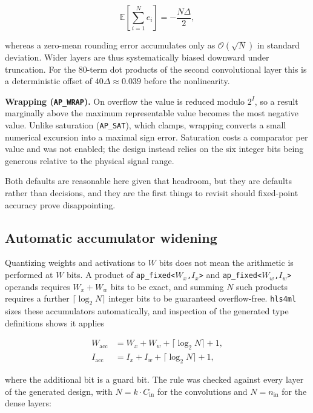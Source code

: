 \documentclass[11pt,a4paper]{article}
\begin{document}
\begin{equation}
\mathbb{E}\!\left[\sum_{i=1}^{N} e_i\right] = -\frac{N\Delta}{2},
\end{equation}

whereas a zero-mean rounding error accumulates only as $\mathcal{O}(\sqrt{N})$
in standard deviation. Wider layers are thus systematically biased downward
under truncation. For the 80-term dot products of the second convolutional
layer this is a deterministic offset of $40\Delta \approx 0.039$ before the
nonlinearity.

\textbf{Wrapping (\texttt{AP\_WRAP}).} On overflow the value is reduced modulo
$2^{I}$, so a result marginally above the maximum representable value becomes
the most negative value. Unlike saturation (\texttt{AP\_SAT}), which clamps,
wrapping converts a small numerical excursion into a maximal sign error.
Saturation costs a comparator per value and was not enabled; the design instead
relies on the six integer bits being generous relative to the physical signal
range.

Both defaults are reasonable here given that headroom, but they are defaults
rather than decisions, and they are the first things to revisit should
fixed-point accuracy prove disappointing.

\subsection{Automatic accumulator widening}
\label{sec:accum}

Quantizing weights and activations to $W$ bits does not mean the arithmetic is
performed at $W$ bits. A product of \texttt{ap\_fixed<$W_x$,$I_x$>} and
\texttt{ap\_fixed<$W_w$,$I_w$>} operands requires $W_x + W_w$ bits to be exact,
and summing $N$ such products requires a further $\lceil \log_2 N \rceil$
integer bits to be guaranteed overflow-free. \texttt{hls4ml} sizes these
accumulators automatically, and inspection of the generated type definitions
shows it applies

\begin{align}
W_{\mathrm{acc}} &= W_x + W_w + \lceil \log_2 N \rceil + 1, \\
I_{\mathrm{acc}} &= I_x + I_w + \lceil \log_2 N \rceil + 1,
\end{align}

where the additional bit is a guard bit. The rule was checked against every
layer of the generated design, with $N = k \cdot C_{\mathrm{in}}$ for the
convolutions and $N = n_{\mathrm{in}}$ for the dense layers:
\end{document}
